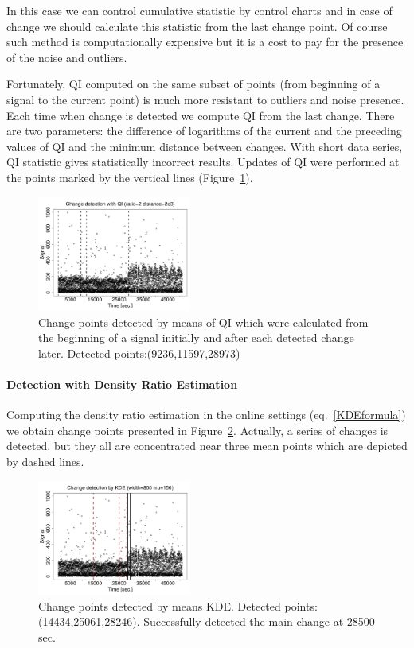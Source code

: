 In this case we can control cumulative statistic by control charts and in case of change we should calculate
this statistic from the last change point. Of course such method is computationally expensive but it is a cost to pay for the presence of the
noise and outliers.

Fortunately, QI computed on the same subset of points (from beginning of a signal to the current point) is much more resistant to outliers and noise presence.
Each time when change is detected we compute QI from the last change.
There are two parameters: the difference of logarithms of the current and the preceding values of QI and the minimum distance between changes.
With short data series, QI statistic gives statistically incorrect results.
Updates of QI were performed at the points marked by the vertical lines (Figure~\ref{figure22}).

\begin{figure}[htb!]
\includegraphics[width=0.45\textwidth]{articles/pics/cfb_paper/OMF/OMFsteadyQI1}
\caption{Change points detected by means of QI which were calculated from the beginning of a signal initially and
after each detected change later. Detected points:(9236,11597,28973)}
\label{figure22}
\end{figure}

\paragraph{Detection with Density Ratio Estimation} 
Computing the density ratio estimation in the online settings (eq.~\ref{KDEformula}) we obtain change points presented in Figure~\ref{figure23}.
Actually, a series of changes is detected, but they all are concentrated near three mean points which are depicted by dashed lines.

\begin{figure}[htb!]
\includegraphics[width=0.45\textwidth]{articles/pics/cfb_paper/OMF/OMFkde}
\caption{Change points detected by means KDE. Detected points:(14434,25061,28246). Successfully detected the main change at 28500 sec.} \label{figure23}
\end{figure}

